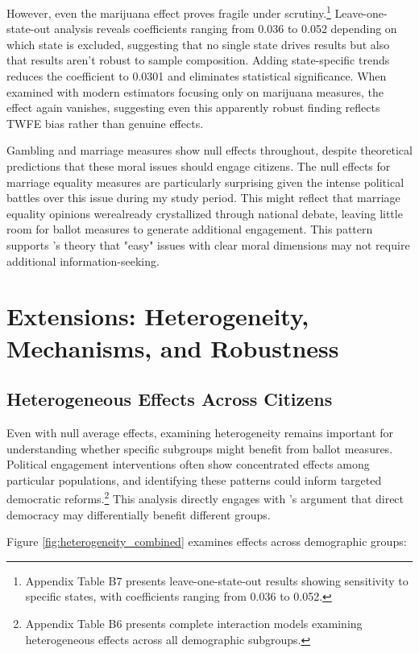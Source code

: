 \documentclass[12pt,letterpaper,oneside]{book}
\begin{document}
However, even the marijuana effect proves fragile under scrutiny.\footnote{Appendix Table B7 presents leave-one-state-out results showing sensitivity to specific states, with coefficients ranging from 0.036 to 0.052.} Leave-one-state-out analysis reveals coefficients ranging from 0.036 to 0.052 depending on which state is excluded, suggesting that no single state drives results but also that results aren't robust to sample composition. Adding state-specific trends reduces the coefficient to 0.0301 and eliminates statistical significance. When examined with modern estimators focusing only on marijuana measures, the effect again vanishes, suggesting even this apparently robust finding reflects TWFE bias rather than genuine effects.

Gambling and marriage measures show null effects throughout, despite theoretical predictions that these moral issues should engage citizens. The null effects for marriage equality measures are particularly surprising given the intense political battles over this issue during my study period. This might reflect that marriage equality opinions werealready crystallized through national debate, leaving little room for ballot measures to generate additional engagement. This pattern supports \citet{carmines1989issue}'s theory that "easy" issues with clear moral dimensions may not require additional information-seeking.

\section{Extensions: Heterogeneity, Mechanisms, and Robustness}

\subsection{Heterogeneous Effects Across Citizens}

Even with null average effects, examining heterogeneity remains important for understanding whether specific subgroups might benefit from ballot measures. Political engagement interventions often show concentrated effects among particular populations, and identifying these patterns could inform targeted democratic reforms.\footnote{Appendix Table B6 presents complete interaction models examining heterogeneous effects across all demographic subgroups.} This analysis directly engages with \citet{matsusaka2005direct}'s argument that direct democracy may differentially benefit different groups.

Figure \ref{fig:heterogeneity_combined} examines effects across demographic groups:
\end{document}
